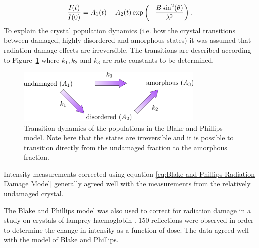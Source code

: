         \begin{equation}
            \frac{I(t)}{I(0)} = A_1(t) + A_2(t) \exp\left(-\frac{B\sin^2(\theta)}{\lambda^2} \right).
            \label{eq:Blake and Phillips Radiation Damage Model}
        \end{equation}
        To explain the crystal population dynamics (i.e. how the crystal transitions between damaged, highly disordered and amorphous states) it was assumed that radiation damage effects are irreversible.
        The transitions are described according to Figure~\ref{fig:Crystal Compartments Blake and Phillips} where $k_1, k_2$ and $k_3$ are rate constants to be determined.
        \begin{figure}[H]
            \centering
            \includegraphics[width=0.8\textwidth]{figures/introduction/crystalcompartments_BP.pdf}
            \caption[Transition dynamics of the populations in the Blake and Phillips radiation damage model]{Transition dynamics of the populations in the Blake and Phillips model.
            Note here that the states are irreversible and it is possible to transition directly from the undamaged fraction to the amorphous fraction.}
            \label{fig:Crystal Compartments Blake and Phillips}
        \end{figure}
        Intensity measurements corrected using equation \ref{eq:Blake and Phillips Radiation Damage Model} generally agreed well with the measurements from the relatively undamaged crystal.

        The Blake and Phillips model was also used to correct for radiation damage in a study on crystals of lamprey haemoglobin \cite{hendrickson1973}.
        150 reflections were observed in order to determine the change in intensity as a function of dose.
        The data agreed well with the model of Blake and Phillips.

